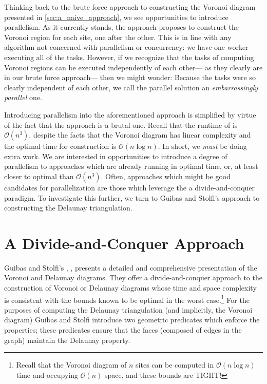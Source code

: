 \documentclass[12pt,twoside]{reedthesis}
\begin{document}
    Thinking back to the brute force approach to constructing the Voronoi diagram presented in \cref{sec:a_naive_approach}, we see opportunities to introduce parallelism. As it currently stands, the approach proposes to construct the Voronoi region for each site, one after the other. This is in line with any algorithm not concerned with parallelism or concurrency: we have one worker executing all of the tasks. However, if we recognize that the tasks of computing Voronoi regions can be executed independently of each other--- as they clearly are in our brute force approach--- then we might wonder:  Because the tasks were so clearly independent of each other, we call the parallel solution an \emph{embarrassingly parallel} one. \par

    Introducing parallelism into the aforementioned approach is simplified by virtue of the fact that the approach is a brutal one. Recall that the runtime of  is $\mathcal{O}(n^3)$, despite the facts that the Voronoi diagram has linear complexity and the optimal time for construction is $\mathcal{O}(n\log n)$. In short, we \emph{must} be doing extra work. We are interested in opportunities to introduce a degree of parallelism to approaches which are already running in optimal time, or, at least closer to optimal than $\mathcal{O}(n^3)$. Often, approaches which might be good candidates for parallelization are those which leverage the a divide-and-conquer paradigm. To investigate this further, we turn to Guibas and Stolfi's approach to constructing the Delaunay triangulation. 


  \section{A Divide-and-Conquer Approach} %
  \label{sec:divide_and_conquer}
    Guibas and Stolfi's , \citealp{guibas}, presents a detailed and comprehensive presentation of the Voronoi and Delaunay diagrams. They offer a divide-and-conquer approach to the construction of Voronoi or Delaunay diagrams whose time and space complexity is consistent with the bounds known to be optimal in the worst case.\footnote{Recall that the Voronoi diagram of $n$ sites can be computed in $\mathcal{O}(n\log n)$ time and occupying $\mathcal{O}(n)$ space, and these bounds are TIGHT!} For the purposes of computing the Delaunay triangulation (and implicitly, the Voronoi diagram)  Guibas and Stolfi introduce two geometric predicates which enforce the  properties; these predicates ensure that the faces (composed of edges in the graph) maintain the Delaunay property. \par 
    
\end{document}
